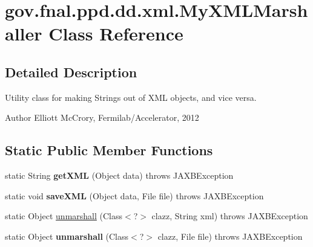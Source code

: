 \hypertarget{classgov_1_1fnal_1_1ppd_1_1dd_1_1xml_1_1MyXMLMarshaller}{\section{gov.\-fnal.\-ppd.\-dd.\-xml.\-My\-X\-M\-L\-Marshaller Class Reference}
\label{classgov_1_1fnal_1_1ppd_1_1dd_1_1xml_1_1MyXMLMarshaller}
}


\subsection{Detailed Description}
Utility class for making Strings out of X\-M\-L objects, and vice versa.

\begin{DoxyAuthor}{Author}
Elliott Mc\-Crory, Fermilab/\-Accelerator, 2012 
\end{DoxyAuthor}
\subsection*{Static Public Member Functions}
\begin{DoxyCompactItemize}
\item 
\hypertarget{classgov_1_1fnal_1_1ppd_1_1dd_1_1xml_1_1MyXMLMarshaller_a81528df65c4fd7426091e36416e1913f}{static String {\bfseries get\-X\-M\-L} (Object data)  throws J\-A\-X\-B\-Exception }\label{classgov_1_1fnal_1_1ppd_1_1dd_1_1xml_1_1MyXMLMarshaller_a81528df65c4fd7426091e36416e1913f}

\item 
\hypertarget{classgov_1_1fnal_1_1ppd_1_1dd_1_1xml_1_1MyXMLMarshaller_aebf26fd9fce0e6866d13c36ed36408d0}{static void {\bfseries save\-X\-M\-L} (Object data, File file)  throws J\-A\-X\-B\-Exception }\label{classgov_1_1fnal_1_1ppd_1_1dd_1_1xml_1_1MyXMLMarshaller_aebf26fd9fce0e6866d13c36ed36408d0}

\item 
static Object \hyperlink{classgov_1_1fnal_1_1ppd_1_1dd_1_1xml_1_1MyXMLMarshaller_a7b08a6b71a1603e3f4eb7dea6f0402b3}{unmarshall} (Class$<$?$>$ clazz, String xml)  throws J\-A\-X\-B\-Exception 
\item 
\hypertarget{classgov_1_1fnal_1_1ppd_1_1dd_1_1xml_1_1MyXMLMarshaller_a5d210178cc498d18018e6bf535617724}{static Object {\bfseries unmarshall} (Class$<$?$>$ clazz, File file)  throws J\-A\-X\-B\-Exception }\label{classgov_1_1fnal_1_1ppd_1_1dd_1_1xml_1_1MyXMLMarshaller_a5d210178cc498d18018e6bf535617724}

\end{DoxyCompactItemize}


